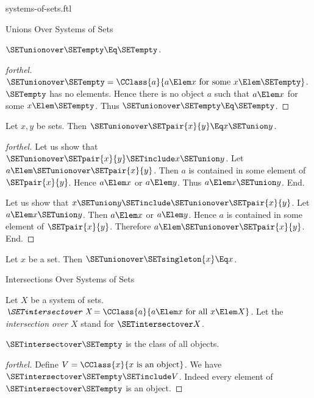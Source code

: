 \documentclass{stex}
\begin{document}
\begin{smodule}{systems-of-sets.ftl}
\begin{sfragment}{Unions Over Systems of Sets}
  \begin{proposition}[forthel]
    $\SETunionover \SETempty \Eq \SETempty$.
  \end{proposition}
  \begin{proof}[forthel]
    $\SETunionover \SETempty = \CClass{a}{a \Elem x\text{ for some }x \Elem \SETempty}$.
    $\SETempty$ has no elements.
    Hence there is no object $a$ such that $a \Elem x$ for some $x \Elem \SETempty$.
    Thus $\SETunionover \SETempty \Eq \SETempty$.
  \end{proof}

  \begin{proposition}[forthel]
    Let $x, y$ be sets.
    Then $\SETunionover \SETpair{x}{y} \Eq x \SETunion y$.
  \end{proposition}
  \begin{proof}[forthel]
    Let us show that $\SETunionover \SETpair{x}{y} \SETinclude x \SETunion y$.
      Let $a \Elem \SETunionover \SETpair{x}{y}$.
      Then $a$ is contained in some element of $\SETpair{x}{y}$.
      Hence $a \Elem x$ or $a \Elem y$.
      Thus $a \Elem x \SETunion y$.
    End.

    Let us show that $x \SETunion y \SETinclude \SETunionover \SETpair{x}{y}$.
      Let $a \Elem x \SETunion y$.
      Then $a \Elem x$ or $a \Elem y$.
      Hence $a$ is contained in some element of $\SETpair{x}{y}$.
      Therefore $a \Elem \SETunionover \SETpair{x}{y}$.
    End.
  \end{proof}

  \begin{corollary}[forthel]
    Let $x$ be a set.
    Then $\SETunionover \SETsingleton{x} \Eq x$.
  \end{corollary}
\end{sfragment}

\begin{sfragment}{Intersections Over Systems of Sets}
  \begin{definition}[forthel,for=intersection over]
    Let $X$ be a system of sets.
    $\emph{\SETintersectover X} = \CClass{a}{a \Elem x\text{ for all }x \Elem X}$.
    Let the \emph{intersection over $X$} stand for $\SETintersectover X$.
  \end{definition}

  \begin{proposition}[forthel]
    $\SETintersectover \SETempty$ is the class of all objects.
  \end{proposition}
  \begin{proof}[forthel]
    Define $V = \CClass{x}{x\text{ is an object}}$.
    We have $\SETintersectover \SETempty \SETinclude V$.
    Indeed every element of $\SETintersectover \SETempty$ is an object.


\end{proof}
\end{sfragment}
\end{smodule}
\end{document}
